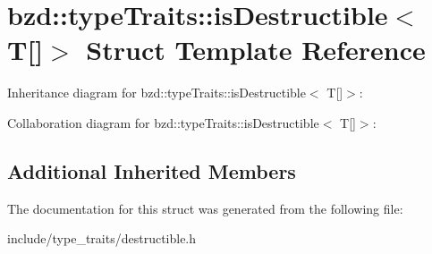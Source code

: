 \hypertarget{structbzd_1_1typeTraits_1_1isDestructible_3_01T[]_4}{}\section{bzd\+:\+:type\+Traits\+:\+:is\+Destructible$<$ T\mbox{[}\mbox{]}$>$ Struct Template Reference}
\label{structbzd_1_1typeTraits_1_1isDestructible_3_01T[]_4}


Inheritance diagram for bzd\+:\+:type\+Traits\+:\+:is\+Destructible$<$ T\mbox{[}\mbox{]}$>$\+:


Collaboration diagram for bzd\+:\+:type\+Traits\+:\+:is\+Destructible$<$ T\mbox{[}\mbox{]}$>$\+:
\subsection*{Additional Inherited Members}


The documentation for this struct was generated from the following file\+:\begin{DoxyCompactItemize}
\item 
include/type\+\_\+traits/destructible.\+h\end{DoxyCompactItemize}
